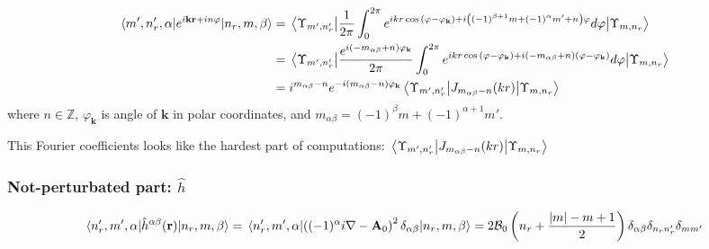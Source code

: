 \documentclass[a4paper,article,14pt]{extarticle}
\begin{document}
\begin{equation}
\begin{aligned}
\mel{m', n'_r, \alpha} {e^{i \mathbf{k}\mathbf{r} + i n \varphi} } {n_r,m, \beta} &= \mel{\Upsilon_{m', n'_r}} {\frac{1}{2 \pi}\int _{0}^{ 2 \pi } e^{i k r \cos{\left( \varphi - \varphi_{\mathbf{k}}  \right)} + i \left((-1)^{\beta+1}m + (-1)^{\alpha} m'  + n \right)  \varphi}    d\varphi} {\Upsilon_{m, n_r}}  \\
&= \mel{\Upsilon_{m', n'_r}} {\frac{  e^{i \left(-m_{\alpha \beta}  + n \right)  \varphi_{\mathbf{k}}}}{2 \pi}\int _{0}^{ 2 \pi } e^{i k r \cos{\left( \varphi - \varphi_{\mathbf{k}}  \right)} + i \left(-m_{\alpha \beta}  + n \right)  (\varphi-\varphi_{\mathbf{k}}) }    d\varphi} {\Upsilon_{m, n_r}} \\
&= i^{m_{\alpha \beta} - n} e^{-i (m_{\alpha \beta} - n)  \varphi_{\mathbf{k}}}  \mel{\Upsilon_{m', n'_r}} {J_{m_{\alpha \beta} - n } (kr) }{\Upsilon_{m, n_r}}
\end{aligned}
\end{equation}
where $n \in\mathbb{Z}$, $\varphi_{\mathbf{k}}$ is angle of $\mathbf{k}$ in polar coordinates, and $m_{\alpha \beta} = (-1)^{\beta}m + (-1)^{\alpha+1} m' $. 


This Fourier coefficients looks like the hardest part of computations: $\mel{\Upsilon_{m', n'_r}} {J_{m_{\alpha \beta}-n} (kr) }{\Upsilon_{m, n_r}}$


\subsubsection{Not-perturbated part: $\hat h$}

\begin{equation}
\mel{n'_r, m', \alpha} {\hat h^{\alpha \beta}(\mathbf{r})} {n_r, m, \beta} = \mel{n'_r, m', \alpha} {\left((-1)^\alpha i \nabla - \mathbf{A}_0 \right) ^ 2 \delta_{\alpha \beta}} {n_r, m, \beta} =  2 {\cal B}_{0} \left( n_r + \frac{|m| - m + 1}{2} \right) \delta_{\alpha \beta} \delta_{n_r n'_r} \delta_{m m'} 
\end{equation}
\end{document}
